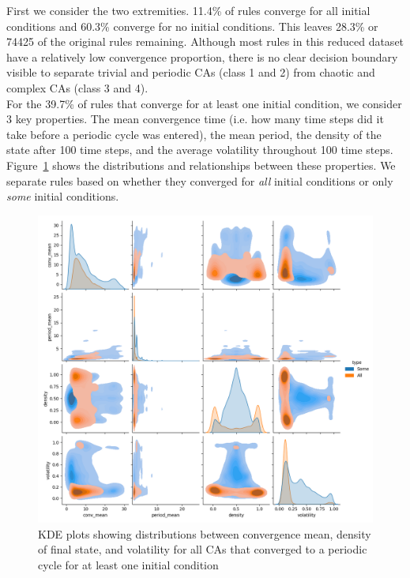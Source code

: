 First we consider the two extremities. 11.4\% of rules converge for all initial conditions and 60.3\% converge for no initial conditions. This leaves 28.3\% or 74425 of the original rules remaining. Although most rules in this reduced dataset have a relatively low convergence proportion, there is no clear decision boundary visible to separate trivial and periodic CAs (class 1 and 2) from chaotic and complex CAs (class 3 and 4).\\

For the 39.7\% of rules that converge for at least one initial condition, we consider 3 key properties. The mean convergence time (i.e. how many time steps did it take before a periodic cycle was entered), the mean period, the density of the state after 100 time steps, and the average volatility throughout 100 time steps. Figure~\ref{fig:tax-pairplot} shows the distributions and relationships between these properties. We separate rules based on whether they converged for \textit{all} initial conditions or only \textit{some} initial conditions.\\

\begin{figure}[!h]
\centering 
\includegraphics[width=\textwidth]{images/tax-pairplot.png}
\caption{KDE plots showing distributions between convergence mean, density of final state, and volatility for all CAs that converged to a periodic cycle for at least one initial condition}
\label{fig:tax-pairplot}
\end{figure}

